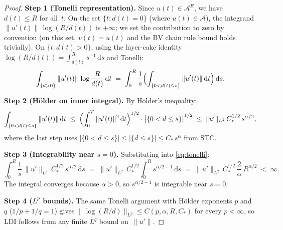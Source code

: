 \documentclass[12pt,a4paper]{article}
\theoremstyle{definition}
\theoremstyle{plain}
\theoremstyle{remark}
\begin{document}
\begin{proof}
\textbf{Step 1 (Tonelli representation).}\;
Since $u(t) \in \mathcal{A}^R$, we have $d(t) \le R$ for all~$t$.
On the set $\{t : d(t) = 0\}$ (where $u(t) \in \mathcal{A}$),
the integrand $\|u'(t)\|\,\log(R/d(t))$ is $+\infty$;
we set the contribution to zero by convention (on this set,
$v(t) = u(t)$ and the BV chain rule bound holds trivially).
On $\{t : d(t) > 0\}$, using the layer-cake identity
$\log(R/d(t)) = \int_{d(t)}^{R} s^{-1}\,\mathrm{d}s$ and Tonelli:
\begin{equation}\label{eq:tonelli}
  \int_{\{d>0\}} \|u'(t)\|\,\log\frac{R}{d(t)}\,\mathrm{d}t
  \;=\;
  \int_0^R \frac{1}{s}
  \Bigl(\int_{\{0 < d(t) \le s\}} \|u'(t)\|\,\mathrm{d}t\Bigr)
  \,\mathrm{d}s.
\end{equation}

\medskip
\noindent
\textbf{Step 2 (H\"older on inner integral).}\;
By H\"older's inequality:
\[
  \int_{\{0<d(t)\le s\}} \|u'(t)\|\,\mathrm{d}t
  \;\le\;
  \Bigl(\int_0^T \|u'(t)\|^2\,\mathrm{d}t\Bigr)^{1/2}
  \cdot
  \bigl|\{0 < d \le s\}\bigr|^{1/2}
  \;\le\;
  \|u'\|_{L^2}\,C_*^{1/2}\,s^{\alpha/2},
\]
where the last step uses $|\{0<d\le s\}| \le |\{d\le s\}|
\le C_*\,s^\alpha$ from STC.

\medskip
\noindent
\textbf{Step 3 (Integrability near $s=0$).}\;
Substituting into \eqref{eq:tonelli}:
\[
  \int_0^R \frac{1}{s}\,\|u'\|_{L^2}\,C_*^{1/2}\,s^{\alpha/2}
  \,\mathrm{d}s
  \;=\;
  \|u'\|_{L^2}\,C_*^{1/2}
  \int_0^R s^{\alpha/2 - 1}\,\mathrm{d}s
  \;=\;
  \|u'\|_{L^2}\,C_*^{1/2}\,
  \frac{2}{\alpha}\,R^{\alpha/2}
  \;<\; \infty.
\]
The integral converges because $\alpha > 0$, so
$s^{\alpha/2-1}$ is integrable near $s=0$.

\medskip
\noindent
\textbf{Step 4 ($L^p$ bounds).}\;
The same Tonelli argument with H\"older exponents $p$ and $q$
($1/p + 1/q = 1$) gives
$\|\log(R/d)\|_{L^p} \le C(p,\alpha,R,C_*)$ for every
$p < \infty$, so LDI follows from any finite $L^q$ bound
on~$\|u'\|$.
\end{proof}
\end{document}
